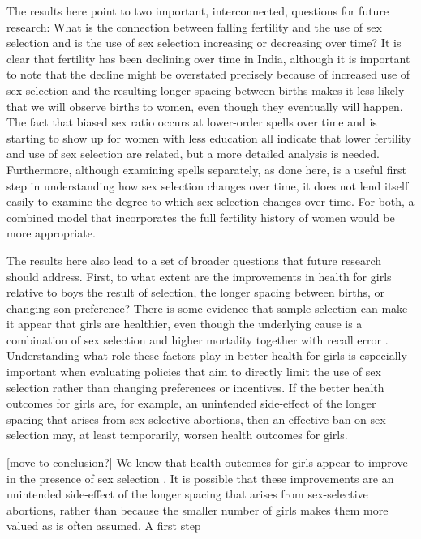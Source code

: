 \documentclass[12pt,letterpaper]{article}
\begin{document}
The results here point to two important, interconnected, questions 
for future research:
What is the connection between falling fertility and the 
use of sex selection and is the use of sex selection increasing 
or decreasing over time?
It is clear that fertility has been declining over time in India,
although it is important to note that the decline might be
overstated precisely because of increased use of sex selection and
the resulting longer spacing between births makes it less likely 
that we will observe births to women, even though they eventually
will happen.
The fact that biased sex ratio occurs at lower-order spells over
time and is starting to show up for women with less education 
all indicate that lower fertility and use of sex selection are
related, but a more detailed analysis is needed.
Furthermore, although examining spells separately, as done here, is a useful
first step in understanding how sex selection changes over time,
it does not lend itself easily to examine the degree to which
sex selection changes over time.
For both, a combined model that incorporates the full fertility
history of women would be more appropriate.


The results here also lead to a set of broader questions that
future research should address.
First, to what extent are the improvements in health for girls
relative to boys the result of selection, the longer spacing between
births, or changing son preference?
There is some evidence that sample selection can make it appear that girls are healthier, 
even though the underlying cause is a combination of sex selection and higher mortality 
together with recall error \citep{Portner2018a}. 
Understanding what role these factors play in better health for
girls is especially important when evaluating policies that 
aim to directly limit the use of sex selection rather than 
changing preferences or incentives.
If the better health outcomes for girls are, for example, an unintended 
side-effect of the longer spacing that arises from sex-selective 
abortions, then an effective ban on sex selection may, at least
temporarily, worsen health outcomes for girls.


[move to conclusion?]
We know that health outcomes for girls appear to improve in the presence of sex 
selection \citep{Lin2014,Hu2015}.
It is possible that these improvements are an unintended side-effect of the longer spacing 
that arises from sex-selective abortions, rather than because the smaller number of girls 
makes them more valued as is often assumed.
A first step 
\end{document}
